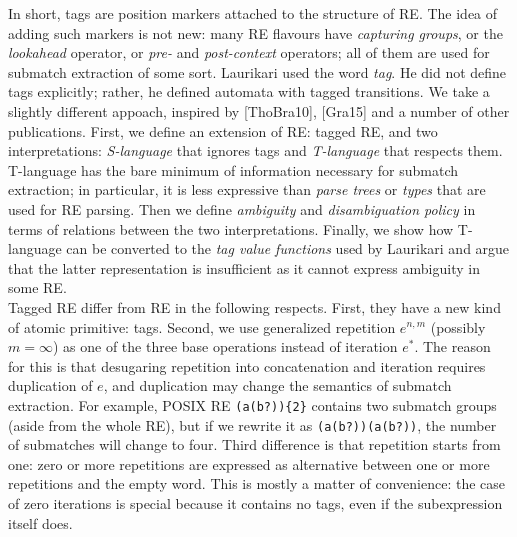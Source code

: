\documentclass{article}
\newcommand{\Xeq}{\!=\!}
\theoremstyle{definition}
\begin{document}
\begin{multicols}{2}
In short, tags are position markers attached to the structure of RE.
The idea of adding such markers is not new:
many RE flavours have \emph{capturing groups}, or the \emph{lookahead} operator, or \emph{pre-} and \emph{post-context} operators;
all of them are used for submatch extraction of some sort.
Laurikari used the word \emph{tag}.
He did not define tags explicitly; rather, he defined automata with tagged transitions.
We take a slightly different appoach, inspired by [ThoBra10], [Gra15] and a number of other publications.
First, we define an extension of RE: tagged RE,
and two interpretations: \emph{S-language} that ignores tags and \emph{T-language} that respects them.
T-language has the bare minimum of information necessary for submatch extraction;
in particular, it is less expressive than \emph{parse trees} or \emph{types} that are used for RE parsing.
Then we define \emph{ambiguity} and \emph{disambiguation policy} in terms of relations between the two interpretations.
Finally, we show how T-language can be converted to the \emph{tag value functions} used by Laurikari
and argue that the latter representation is insufficient as it cannot express ambiguity in some RE.
\\

Tagged RE differ from RE in the following respects.
First, they have a new kind of atomic primitive: tags.
Second, we use generalized repetition $e^{n,m}$ (possibly $m \Xeq \infty$) as one of the three base operations instead of iteration $e^*$.
The reason for this is that
desugaring repetition into concatenation and iteration requires duplication of $e$,
and duplication may change the semantics of submatch extraction.
For example, POSIX RE \texttt{(a(b?))\{2\}} contains two submatch groups (aside from the whole RE),
but if we rewrite it as \texttt{(a(b?))(a(b?))}, the number of submatches will change to four.
Third difference is that repetition starts from one: zero or more repetitions are expressed as alternative between one or more repetitions and the empty word.
This is mostly a matter of convenience:
the case of zero iterations is special because it contains no tags, even if the subexpression itself does.


\end{multicols}
\end{document}
